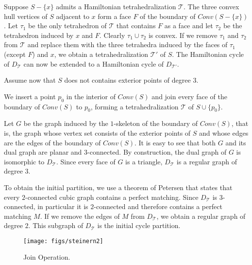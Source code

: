 \documentclass{article}
\def\QED{\ensuremath{{\square}}}
\def\markatright#1{\leavevmode\unskip\nobreak\quad\hspace*{\fill}{#1}}
\newenvironment{proof}
  {\begin{trivlist}\item[\hskip\labelsep{\bf Proof.}]}
  {\markatright{\QED}\end{trivlist}}
\newcommand{\Conv}{\mathit{Conv}}
\begin{document}
\begin{proof}
Suppose $S-\{x\}$ admits a Hamiltonian tetrahedralization 
$\mathcal{T}$. The three convex hull vertices of $S$ 
adjacent to $x$ form a face  $F$ of the boundary of
 $\Conv(S-\{x\})$.
Let $\tau_1$ be the only tetrahedron of $\mathcal{T}$ that 
contains $F$ as a face and let $\tau_2$ be the 
tetrahedron induced by $x$ and $F$. Clearly $\tau_1 \cup \tau_2$
is convex.
If we remove $\tau_1$ and  $\tau_2$ from $\mathcal{T}$
 and replace them
with the three tetrahedra induced by the faces of $\tau_1$
(except $F$) and $x$, we obtain a tetrahedralization 
$\mathcal{T}'$ of $S$. The Hamiltonian cycle of 
$D_\mathcal{T}$ can now be extended to a Hamiltonian cycle
of $D_{\mathcal{T}'}$.
\end{proof}



Assume now  that $S$ does not contains 
exterior points of degree $3$.\par

We insert a point $p_0$ in the interior of $\Conv(S)$ and join
every face of the boundary of $\Conv(S)$ to $p_0$, forming 
a tetrahedralization $\mathcal{T}$ of $S \cup \{ p_0\} $.\par

Let $G$ be the graph induced by the $1$-skeleton of 
the boundary of $\Conv(S)$, that is, the graph whose vertex set
consists of the exterior points of $S$ and whose edges are the edges
of the boundary of $\Conv(S)$. It is easy to see that both $G$ and its dual graph are planar 
and $3$-connected.
By construction, the dual graph of $G$ is isomorphic to 
$D_\mathcal{T}$. Since every face of $G$ is a triangle, 
$D_\mathcal{T}$ is a regular graph of degree $3$.\par

To obtain the initial partition, we use a theorem of
Petersen \cite{petersen} that states that every $2$-connected
cubic graph contains a perfect matching. Since
$D_\mathcal{T}$ is $3$-connected, in particular it is
 $2$-connected and therefore contains a perfect matching $M$. 
If we remove the edges of $M$ from $D_\mathcal{T}$, we obtain
a regular graph of degree $2$. This subgraph of $D_\mathcal{T}$
is the initial cycle partition.\par

\begin{figure} \label{steinerfig}
  \begin{center}
    \texttt{[image: figs/steinern2]}
  \end{center}
    \caption{Join Operation.}
\end{figure}
\end{document}
